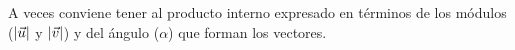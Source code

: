 A veces conviene tener al producto interno expresado en términos de los módulos (${\left| {\vec{u}} \right|}$ y ${\left| {\vec{v}} \right|}$) y del ángulo ($\alpha$) que forman los vectores.



